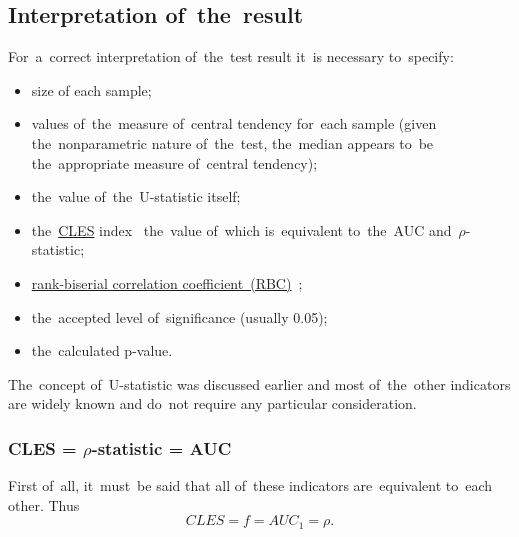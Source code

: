 \documentclass[]{scrreprt}
\begin{document}
\subsection{Interpretation of~the~result}
For~a~correct interpretation of~the~test result it~is necessary to~specify:
\begin{itemize}
	\item size of each sample;
	\item values of~the~measure of~central tendency for~each sample (given the~nonparametric nature of~the~test, the~median appears to~be the~appropriate measure of~central tendency);
	\item the~value of~the~U-statistic itself;
	\item the~\href{https://en.wikipedia.org/wiki/Effect_size#Common_language_effect_size}{CLES} index~\cite{Wiki:CLES} the~value of~which is~equivalent to~the~AUC and~$\rho$-statistic;
	\item \href{https://en.wikipedia.org/wiki/Effect_size#Rank-biserial_correlation}{rank-biserial correlation coefficient~(RBC)}~\cite{Wiki:rank-biserial-correlation};
	\item the~accepted level of~significance (usually 0.05);
	\item the~calculated p-value.
\end{itemize}
The~concept of~U-statistic was discussed earlier and most of~the~other indicators are widely known and do~not require any particular consideration. 
\subsubsection{CLES = $\rho$-statistic = AUC}
First of~all, it~must~be said that all of~these indicators are~equivalent to~each other. Thus
\begin{equation}\label{eq:AUC=CLES}
CLES = f = AUC_{1} = \rho.
\end{equation}
\end{document}
